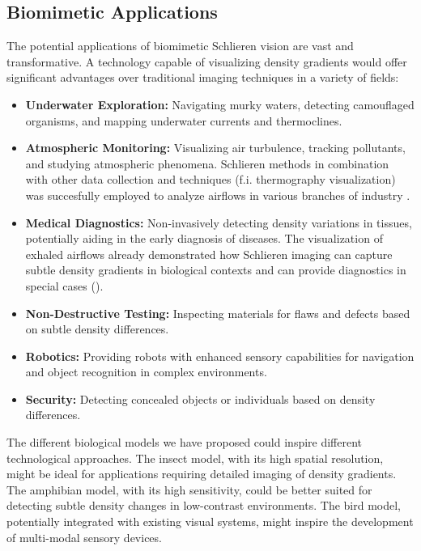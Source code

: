 \documentclass[11pt]{article}
\begin{document}
\subsection{Biomimetic Applications}

The potential applications of biomimetic Schlieren vision are vast and transformative. A technology capable of visualizing density gradients would offer significant advantages over traditional imaging techniques in a variety of fields:
\begin{itemize}
    \item \textbf{Underwater Exploration:} Navigating murky waters, detecting camouflaged organisms, and mapping underwater currents and thermoclines.
    \item \textbf{Atmospheric Monitoring:} Visualizing air turbulence, tracking pollutants, and studying atmospheric phenomena. Schlieren methods in combination with other data collection and techniques (f.i. thermography visualization) was succesfully employed to analyze airflows in various branches of industry \cite{Alsaad2020QualitativeEvaluation}.
    \item \textbf{Medical Diagnostics:} Non-invasively detecting density variations in tissues, potentially aiding in the early diagnosis of diseases. The visualization of exhaled airflows already demonstrated how Schlieren imaging can capture subtle density gradients in biological contexts and can provide diagnostics in special cases (\cite{Xu2017Exhalation, Tang2011Schlieren}). 
    \item \textbf{Non-Destructive Testing:} Inspecting materials for flaws and defects based on subtle density differences.
    \item \textbf{Robotics:} Providing robots with enhanced sensory capabilities for navigation and object recognition in complex environments.
    \item \textbf{Security:} Detecting concealed objects or individuals based on density differences.
\end{itemize}
The different biological models we have proposed could inspire different technological approaches. The insect model, with its high spatial resolution, might be ideal for applications requiring detailed imaging of density gradients. The amphibian model, with its high sensitivity, could be better suited for detecting subtle density changes in low-contrast environments. The bird model, potentially integrated with existing visual systems, might inspire the development of multi-modal sensory devices.
\end{document}
